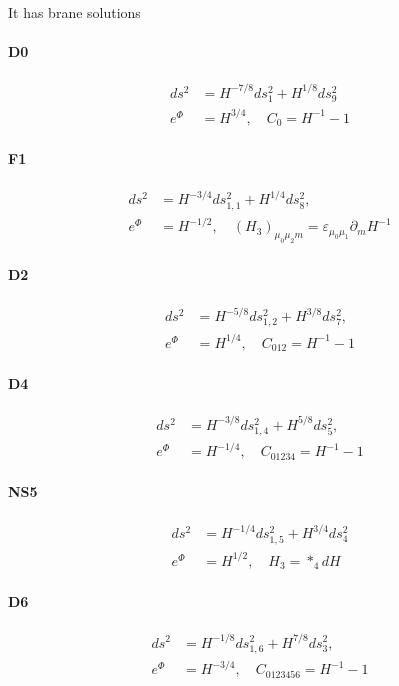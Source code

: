 It has brane solutions

\paragraph{D0}
\begin{align}
ds^2 &= H^{-7/8}ds_1^2 + H^{1/8}ds_9^2\\
e^{\Phi} &= H^{3/4},\quad
C_0 = H^{-1}-1
\end{align}

\paragraph{F1}
\begin{align}
ds^2 
&= H^{-3/4}ds_{1,1}^2 + H^{1/4}ds_8^2,\\
e^{\Phi}
&= H^{-1/2},\quad
(H_3)_{\mu_0\mu_2 m} = \varepsilon_{\mu_0 \mu_1} \partial_m H^{-1}
\end{align}

\paragraph{D2}
\begin{align}
ds^2
&= H^{-5/8}ds_{1,2}^2 + H^{3/8}ds_7^2,\\
e^{\Phi}
&= H^{1/4},\quad
C_{012} = H^{-1}-1
\end{align}

\paragraph{D4}
\begin{align}
ds^2
&= H^{-3/8}ds_{1,4}^2 + H^{5/8}ds_5^2,\\
e^{\Phi}
&= H^{-1/4},\quad
C_{01234} = H^{-1}-1
\end{align}

\paragraph{NS5}
\begin{align}
ds^2 
&= H^{-1/4}ds_{1,5}^2 + H^{3/4}ds_4^2\\
e^{\Phi}
&= H^{1/2},\quad H_3 = *_4 dH
\end{align}

\paragraph{D6}
\begin{align}
ds^2 
&= H^{-1/8}ds_{1,6}^2 + H^{7/8}ds_3^2,\\
e^{\Phi}
&= H^{-3/4},\quad
C_{0123456} = H^{-1}-1
\end{align}
